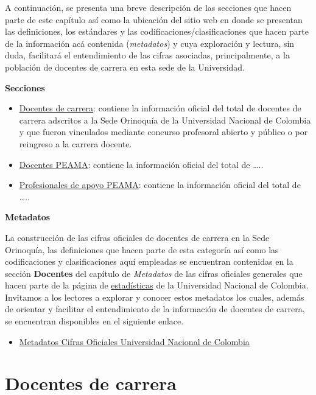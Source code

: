 \documentclass[
]{book}
\providecommand{\tightlist}{%
  \setlength{\itemsep}{0pt}\setlength{\parskip}{0pt}}
\begin{document}
A continuación, se presenta una breve descripción de las secciones que hacen parte de este capítulo así como la ubicación del sitio web en donde se presentan las definiciones, los estándares y las codificaciones/clasificaciones que hacen parte de la información acá contenida (\emph{metadatos}) y cuya exploración y lectura, sin duda, facilitará el entendimiento de las cifras asociadas, principalmente, a la población de docentes de carrera en esta sede de la Universidad.

\textbf{Secciones}

\begin{itemize}
\item
  \protect\hyperlink{DocCar}{Docentes de carrera}: contiene la información oficial del total de docentes de carrera adscritos a la Sede Orinoquía de la Universidad Nacional de Colombia y que fueron vinculados mediante concurso profesoral abierto y público o por reingreso a la carrera docente.
\item
  \protect\hyperlink{DocPEAMA}{Docentes PEAMA}: contiene la información oficial del total de \ldots..
\item
  \protect\hyperlink{DocApo}{Profesionales de apoyo PEAMA}: contiene la información oficial del total de \ldots..
\end{itemize}

\textbf{Metadatos}

La construcción de las cifras oficiales de docentes de carrera en la Sede Orinoquía, las definiciones que hacen parte de esta categoría así como las codificaciones y clasificaciones aquí empleadas se encuentran contenidas en la sección \textbf{Docentes} del capítulo de \emph{Metadatos} de las cifras oficiales generales que hacen parte de la página de \href{http://estadisticas.unal.edu.co/home/}{estadísticas} de la Universidad Nacional de Colombia. Invitamos a los lectores a explorar y conocer estos metadatos los cuales, además de orientar y facilitar el entendimiento de la información de docentes de carrera, se encuentran disponibles en el siguiente enlace.

\begin{itemize}
\tightlist
\item
  \href{http://estadisticas.unal.edu.co/menu-principal/cifras-generales/metadatos/cifras-generales/}{Metadatos Cifras Oficiales Universidad Nacional de Colombia}
\end{itemize}

\hypertarget{DocCar}{%
\section{Docentes de carrera}\label{DocCar}}
\end{document}
